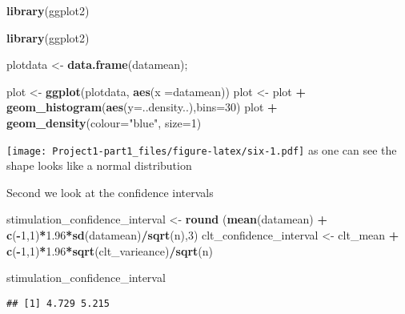 \documentclass[
]{article}
\newenvironment{Shaded}{\begin{snugshade}}{\end{snugshade}}
\newcommand{\DataTypeTok}[1]{\textcolor[rgb]{0.13,0.29,0.53}{#1}}
\newcommand{\DecValTok}[1]{\textcolor[rgb]{0.00,0.00,0.81}{#1}}
\newcommand{\FloatTok}[1]{\textcolor[rgb]{0.00,0.00,0.81}{#1}}
\newcommand{\KeywordTok}[1]{\textcolor[rgb]{0.13,0.29,0.53}{\textbf{#1}}}
\newcommand{\NormalTok}[1]{#1}
\newcommand{\OperatorTok}[1]{\textcolor[rgb]{0.81,0.36,0.00}{\textbf{#1}}}
\newcommand{\StringTok}[1]{\textcolor[rgb]{0.31,0.60,0.02}{#1}}
\begin{document}
\begin{Shaded}
\begin{Highlighting}[]
\KeywordTok{library}\NormalTok{(ggplot2)}

\KeywordTok{library}\NormalTok{(ggplot2)}

\NormalTok{plotdata <-}\StringTok{ }\KeywordTok{data.frame}\NormalTok{(datamean);}

\NormalTok{plot <-}\StringTok{ }\KeywordTok{ggplot}\NormalTok{(plotdata, }\KeywordTok{aes}\NormalTok{(}\DataTypeTok{x =}\NormalTok{datamean))}
\NormalTok{plot <-}\StringTok{ }\NormalTok{plot }\OperatorTok{+}\StringTok{ }\KeywordTok{geom_histogram}\NormalTok{(}\KeywordTok{aes}\NormalTok{(}\DataTypeTok{y=}\NormalTok{..density..),}\DataTypeTok{bins=}\DecValTok{30}\NormalTok{)}
\NormalTok{plot }\OperatorTok{+}\StringTok{ }\KeywordTok{geom_density}\NormalTok{(}\DataTypeTok{colour=}\StringTok{"blue"}\NormalTok{, }\DataTypeTok{size=}\DecValTok{1}\NormalTok{)}
\end{Highlighting}
\end{Shaded}

\texttt{[image: Project1-part1\_files/figure-latex/six-1.pdf]} as one can
see the shape looks like a normal distribution

Second we look at the confidence intervals

\begin{Shaded}
\begin{Highlighting}[]
\NormalTok{stimulation_confidence_interval  <-}\StringTok{ }\KeywordTok{round}\NormalTok{ (}\KeywordTok{mean}\NormalTok{(datamean) }\OperatorTok{+}\StringTok{ }\KeywordTok{c}\NormalTok{(}\OperatorTok{-}\DecValTok{1}\NormalTok{,}\DecValTok{1}\NormalTok{)}\OperatorTok{*}\FloatTok{1.96}\OperatorTok{*}\KeywordTok{sd}\NormalTok{(datamean)}\OperatorTok{/}\KeywordTok{sqrt}\NormalTok{(n),}\DecValTok{3}\NormalTok{)}
\NormalTok{clt_confidence_interval <-}\StringTok{ }\NormalTok{clt_mean }\OperatorTok{+}\StringTok{ }\KeywordTok{c}\NormalTok{(}\OperatorTok{-}\DecValTok{1}\NormalTok{,}\DecValTok{1}\NormalTok{)}\OperatorTok{*}\FloatTok{1.96}\OperatorTok{*}\KeywordTok{sqrt}\NormalTok{(clt_varieance)}\OperatorTok{/}\KeywordTok{sqrt}\NormalTok{(n)}

\NormalTok{stimulation_confidence_interval}
\end{Highlighting}
\end{Shaded}

\begin{verbatim}
## [1] 4.729 5.215
\end{verbatim}
\end{document}
